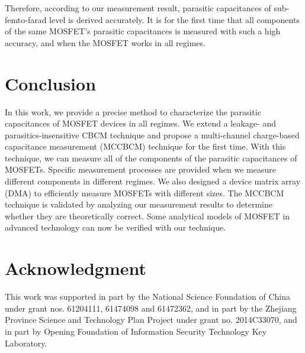 \documentclass[journal]{IEEEtran}
\begin{document}
Therefore, according to our measurement result, parasitic capacitances of sub-femto-farad level is derived accurately. It is for the first time that all components of the same MOSFET's parasitic capacitances is measured with such a high accuracy, and when the MOSFET works in all regimes. 








\section{Conclusion}

In this work, we provide a precise method to characterize the parasitic capacitances of MOSFET devices in all regimes. We extend a leakage- and parasitics-insensitive CBCM technique and propose a multi-channel charge-based capacitance measurement (MCCBCM) technique for the first time. With this technique, we can measure all of the components of the parasitic capacitances of MOSFETs. Specific measurement processes are provided when we measure different components in different regimes. We also designed a device matrix array (DMA) to efficiently measure MOSFETs with different sizes. The MCCBCM technique is validated by analyzing our measurement results to determine whether they are theoretically correct. Some analytical models of MOSFET in advanced technology can now be verified with our technique.  








\section*{Acknowledgment}


This work was supported in part by the National Science Foundation of China under grant nos. 61204111, 61474098 and 61472362, and in part by the Zhejiang Province Science and Technology Plan Project under grant no. 2014C33070, and in part by Opening Foundation of Information Security Technology Key Laboratory.










\end{document}
